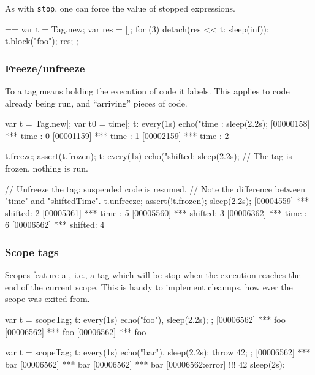 As with \lstinline|stop|, one can force the value of stopped
expressions.

\begin{urbiassert}
==
{
  var t = Tag.new;
  var res = [];
  for (3)
    detach(res << {t: sleep(inf)});
  t.block("foo");
  res;
};
\end{urbiassert}

\subsubsection{Freeze/unfreeze}
\label{sec:specs:tag:freeze}

To  a tag means holding the execution of code it labels.
This applies to code already being run, and ``arriving'' pieces of code.

\begin{urbiscript}
var t = Tag.new|;
var t0 = time|;
t: every(1s) echo("time   : %
sleep(2.2s);
[00000158] *** time   : 0
[00001159] *** time   : 1
[00002159] *** time   : 2

t.freeze;
assert(t.frozen);
t: every(1s) echo("shifted: %
sleep(2.2s);
// The tag is frozen, nothing is run.

// Unfreeze the tag: suspended code is resumed.
// Note the difference between "time" and "shiftedTime".
t.unfreeze;
assert(!t.frozen);
sleep(2.2s);
[00004559] *** shifted: 2
[00005361] *** time   : 5
[00005560] *** shifted: 3
[00006362] *** time   : 6
[00006562] *** shifted: 4
\end{urbiscript}


\subsubsection{Scope tags}
\label{sec:specs:tag:scope}

Scopes feature a , i.e., a tag which will be stop
when the execution reaches the end of the current scope.  This is
handy to implement cleanups, how ever the scope was exited from.

\begin{urbiscript}
{
  var t = scopeTag;
  t: every(1s)
      echo("foo"),
  sleep(2.2s);
};
[00006562] *** foo
[00006562] *** foo
[00006562] *** foo

{
  var t = scopeTag;
  t: every(1s)
      echo("bar"),
  sleep(2.2s);
  throw 42;
};
[00006562] *** bar
[00006562] *** bar
[00006562] *** bar
[00006562:error] !!! 42
sleep(2s);
\end{urbiscript}

